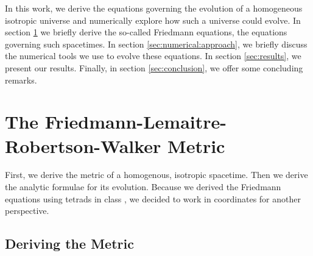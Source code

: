 \documentclass[]{article}
\begin{document}
In this work, we derive the equations governing the evolution of a
homogeneous isotropic universe and numerically explore how such a
universe could evolve. In section \ref{sec:the:metric} we briefly
derive the so-called Friedmann equations, the equations governing such
spacetimes. In section \ref{sec:numerical:approach}, we briefly
discuss the numerical tools we use to evolve these equations. In
section \ref{sec:results}, we present our results. Finally, in section
\ref{sec:conclusion}, we offer some concluding remarks.

\section{The Friedmann-Lemaitre-Robertson-Walker Metric}
\label{sec:the:metric}

First, we derive the metric of a homogenous, isotropic spacetime. Then
we derive the analytic formulae for its evolution. Because we derived
the Friedmann equations using tetrads in class \cite{Kempf}, we
decided to work in coordinates for another perspective.

\subsection{Deriving the Metric}
\label{subsec:metric:derivation}
\end{document}
